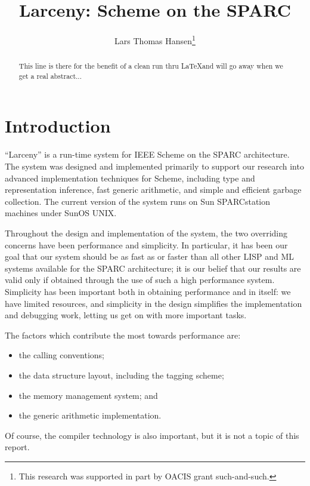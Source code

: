 %

\topmargin      -2.0cm
\oddsidemargin   0.0cm
\evensidemargin  0.0cm
\textwidth       6.5in
\textheight      9.0in
\parindent       0.0cm
\parskip         0.4cm

\title{Larceny: Scheme on the SPARC}
\author{Lars Thomas Hansen\thanks{This research was supported in part
by OACIS grant such-and-such.}}


\titlebox
\begin{abstract}
This line is there for the benefit of a clean run thru \LaTeX and will go away
when we get a real abstract...
\end{abstract}
\pagebreak

\section{Introduction}

``Larceny'' is a run-time system for IEEE Scheme \cite{IEEEscheme} on the
SPARC \cite{SPARC} architecture. The system was designed and implemented
primarily to support our research into advanced implementation techniques
for Scheme, including type and representation inference, fast generic
arithmetic, and simple and efficient garbage collection. The current version
of the system runs on Sun SPARCstation machines under SunOS UNIX.

Throughout the design and implementation of the system, the two overriding
concerns have been performance and simplicity. In particular, it has been
our goal that our system should be as fast as or faster than all other LISP
and ML systems available for the SPARC architecture; it is our belief that
our results are valid only if obtained through the use of such a high
performance system.  Simplicity has been important both in obtaining
performance and in itself: we have limited resources, and simplicity in the
design simplifies the implementation and debugging work, letting us get on
with more important tasks.

The factors which contribute the most towards performance are:
\begin{itemize}
\item the calling conventions;
\item the data structure layout, including the tagging scheme;
\item the memory management system; and
\item the generic arithmetic implementation.
\end{itemize}
Of course, the compiler technology is also important, but it is not a topic
of this report.

